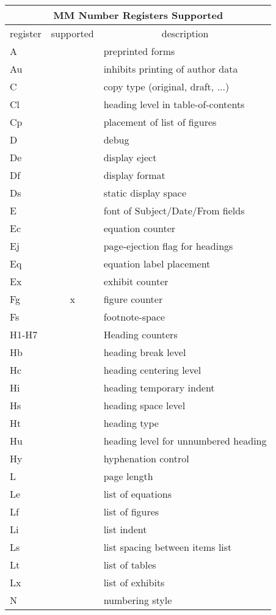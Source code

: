 \noindent
\begin{center}
\begin{tabular}{|l|c|l|}
\hline
\multicolumn{3}{|c|}{{\vrule height12pt width0pt depth3.5pt\Large
MM Number Registers Supported}}\\ 
\hline\hline
register&	 supported&\multicolumn{1}{|c|}{description}\\
\hline
A&	&	preprinted forms\\
Au&	&	inhibits printing of author data\\
C&	&	copy type (original, draft, ...)\\
Cl&	&	heading level in table-of-contents\\
Cp&	&	placement of list of figures\\
D&	&	debug\\
De&	&	display eject\\
Df&	&	display format\\ 
Ds&	&	static display space\\
E&	&	font of Subject/Date/From fields\\
Ec&	&	equation counter\\
Ej&	&		page-ejection flag for headings\\
Eq&	&		equation label placement\\
Ex&	&		exhibit counter\\
Fg&	x&	figure counter\\
Fs&	&		footnote-space\\
H1-H7&	&		Heading counters\\
Hb&	&		heading break level\\
Hc&	&		heading centering level\\
Hi&	&		heading temporary indent\\
Hs&	&		heading space level\\
Ht&	&		heading type\\
Hu&	&		heading level for unnumbered heading\\
Hy&	&		hyphenation control\\
L&	&		page length\\
Le&	&		list of equations\\
Lf&	&		list of figures\\
Li&	&		list indent\\
Ls&	&		list spacing between items list\\
Lt&	&		list of tables\\
Lx&	&		list of exhibits\\
N&	&		numbering style\\

\end{tabular}
\end{center}
